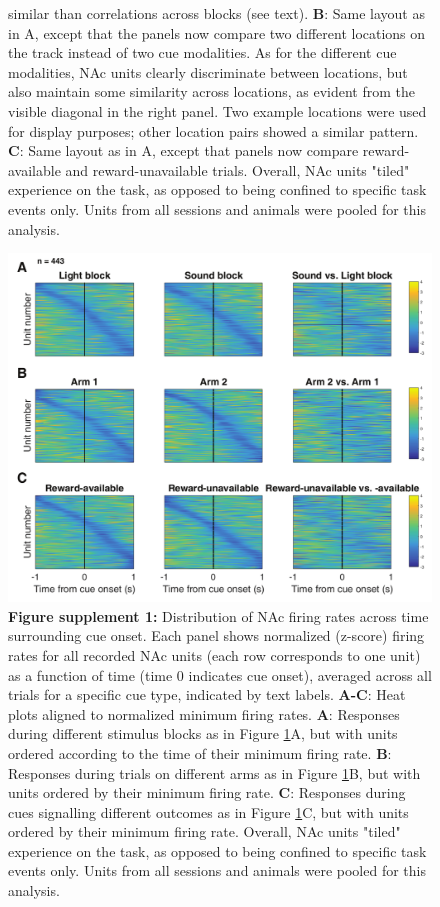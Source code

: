 \documentclass[11pt]{article}
\newcommand{\bsf}[1]{\textbf{#1}}
\begin{document}
\begin{figure}[ht!]
{similar than correlations across blocks (see text). \bsf{B}: Same layout as in
A, except that the panels now compare two different locations on the track
instead of two cue modalities. As for the different cue modalities, NAc units
clearly discriminate between locations, but also maintain some similarity
across locations, as evident from the visible diagonal in the right panel. Two
example locations were used for display purposes; other location pairs showed
a similar pattern. \bsf{C}: Same layout as in A, except that panels now
compare reward-available and reward-unavailable trials. Overall, NAc units
"tiled" experience on the task, as opposed to being confined to specific task
events only. Units from all sessions and animals were pooled for this
analysis.}
\label{fig:tiling}
\end{figure} \clearpage

 \begin{figure}[ht!]
\centering
\includegraphics[width=\textwidth]{Fig 6 - SUPP Task tiling MIN.pdf}
\caption*{\bsf{Figure supplement 1:} Distribution of NAc firing rates across time surrounding cue
onset. Each panel shows normalized (z-score) firing rates for all recorded NAc
units (each row corresponds to one unit) as a function of time (time 0
indicates cue onset), averaged across all trials for a specific cue type,
indicated by text labels. \bsf{A-C}: Heat plots
aligned to normalized minimum firing rates. \bsf{A}: Responses during
different stimulus blocks as in Figure \ref{fig:tiling}A, but with units ordered according to the
time of their minimum firing rate. \bsf{B}: Responses during trials on
different arms as in Figure \ref{fig:tiling}B, but with units ordered by their minimum firing
rate. \bsf{C}: Responses during cues signalling different outcomes as in Figure \ref{fig:tiling}C,
but with units ordered by their minimum firing rate. Overall, NAc units
"tiled" experience on the task, as opposed to being confined to specific task
events only. Units from all sessions and animals were pooled for this
analysis.}
\label{fig:tilingSUPP1}
\end{figure} \clearpage
\end{document}
